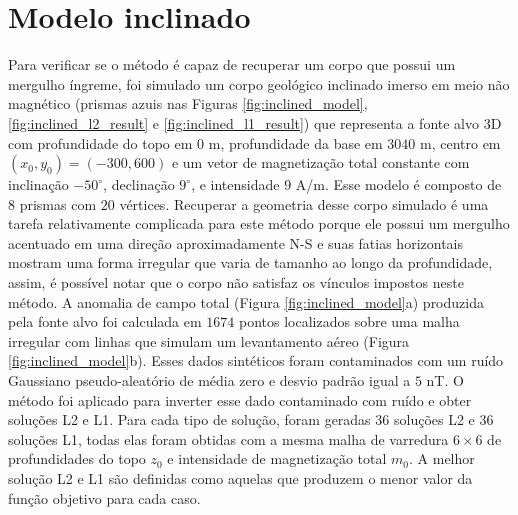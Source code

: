 \pagebreak

\section{Modelo inclinado}

Para verificar se o método é capaz de recuperar um corpo que possui um mergulho íngreme, foi simulado um corpo geológico inclinado imerso em meio não magnético (prismas azuis nas Figuras 
\ref{fig:inclined_model}, \ref{fig:inclined_l2_result} e \ref{fig:inclined_l1_result})
que representa a fonte alvo 3D com profundidade do topo em $0$ m, profundidade da base em $3040$ m, centro em $ (x_0, y_0) = (-300, 600) $ e um vetor de magnetização total constante com inclinação $-50^{\circ}$, declinação $9^{\circ}$, e intensidade $9$ A/m.
Esse modelo é composto de $ 8 $ prismas com $ 20 $ vértices.
Recuperar a geometria desse corpo simulado é uma tarefa relativamente complicada para este método porque ele possui um mergulho acentuado em uma direção aproximadamente N-S e suas fatias horizontais mostram uma forma irregular que varia de tamanho ao longo da profundidade, assim, é possível notar que o corpo não satisfaz os vínculos impostos neste método.
A anomalia de campo total (Figura \ref{fig:inclined_model}a) produzida pela fonte alvo foi calculada em $1674$ pontos localizados sobre uma malha irregular com linhas que simulam um levantamento aéreo (Figura \ref{fig:inclined_model}b). Esses dados sintéticos foram contaminados com um ruído Gaussiano pseudo-aleatório de média zero e desvio padrão igual a $5$ nT.
O método foi aplicado para inverter esse dado contaminado com ruído e obter soluções L2 e L1.
Para cada tipo de solução, foram geradas $36$ soluções L2 e $36$ soluções L1, 
todas elas foram obtidas com a mesma malha de varredura $6 \times 6$ de profundidades do topo $z_{0}$ e intensidade de magnetização total $m_{0}$.
A melhor solução L2 e L1 são definidas como aquelas que produzem o menor valor da função objetivo para cada caso.

